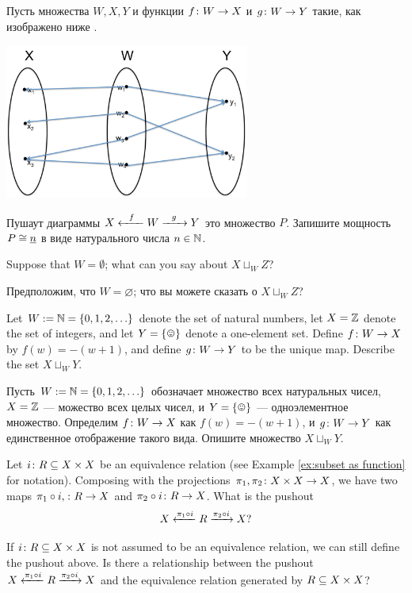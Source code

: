 \documentclass[CT4S-EN-RU]{subfiles}
\begin{document}
\begin{exerciseRUS}
Пусть множества $W,X,Y$ и функции $f\taking W\to X$ и $g\taking W\to Y$ такие, как изображено ниже . 
\begin{center}
\includegraphics[height=2in]{setPushout}
\end{center}
Пушаут диаграммы $X\Fromm{f}W\Too{g}Y$ это множество $P$. Запишите мощность $P\iso\ul{n}$ в виде натурального числа $n\in\NN$.  
\end{exerciseRUS}

\begin{exerciseENG}
Suppose that $W=\emptyset$; what can you say about $X\sqcup_WZ$? 
\end{exerciseENG}

\begin{exerciseRUS}
Предположим, что $W=\varnothing$; что вы можете сказать о $X\sqcup_WZ$? 
\end{exerciseRUS}

\begin{exerciseENG}
Let $W:=\NN=\{0,1,2,\ldots\}$ denote the set of natural numbers, let $X=\ZZ$ denote the set of integers, and let $Y=\singleton$ denote a one-element set. Define $f\taking W\to X$ by $f(w)= -(w+1)$, and define $g\taking W\to Y$ to be the unique map. Describe the set $X\sqcup_WY$.
\end{exerciseENG}

\begin{exerciseRUS}
Пусть $W:=\NN=\{0,1,2,\ldots\}$ обозначает множество всех натуральных чисел, $X=\ZZ$ — можество всех целых чисел, и $Y=\singleton$ — одноэлементное множество. Определим $f\taking W\to X$ как $f(w)= -(w+1)$, и $g\taking W\to Y$ как единственное отображение такого вида. Опишите множество $X\sqcup_WY$.
\end{exerciseRUS}

\begin{exerciseENG}
Let $i\taking R\ss X\times X$ be an equivalence relation (see Example \ref{ex:subset as function} for notation). Composing with the projections $\pi_1,\pi_2\taking X\times X\to X$, we have two maps $\pi_1\circ i,\taking R\to X$ and $\pi_2\circ i\taking R\to X$. 
\sexc What is the pushout $$X\From{\pi_1\circ i}R\To{\pi_2\circ i}X?$$ 
\item If $i\taking R\ss X\times X$ is not assumed to be an equivalence relation, we can still define the pushout above. Is there a relationship between the pushout $X\From{\pi_1\circ i}R\To{\pi_2\circ i}X$ and the equivalence relation generated by $R\ss X\times X$?
\endsexc
\end{exerciseENG}
\end{document}
